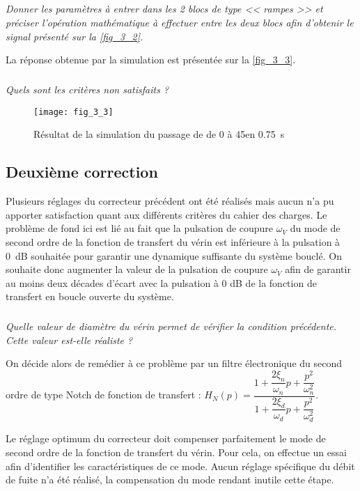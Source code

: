 \subparagraph{}
\textit{Donner les paramètres à entrer dans les 2 blocs de type << rampes >> et préciser l'opération mathématique à effectuer entre les deux blocs afin d'obtenir le signal présenté sur la \autoref{fig_3_2}.}
\ifprof
\begin{corrige}
\end{corrige}
\else
\fi

La réponse obtenue par la simulation est présentée sur la \autoref{fig_3_3}.

\subparagraph{}
\textit{Quels sont les critères non satisfaits ?}
\ifprof
\begin{corrige}
\end{corrige}
\else
\fi


\begin{figure}[H]
\centering
\texttt{[image: fig\_3\_3]}
\caption{Résultat de la simulation du passage de de 0 à 45\degres en \SI{0,75}{s}}
\label{fig_3_3}
\end{figure}




\subsection{Deuxième correction}

Plusieurs réglages du correcteur précédent ont été réalisés mais aucun n'a pu apporter satisfaction quant aux différents critères du cahier des charges. Le problème de fond ici est lié au fait que la pulsation de coupure $\omega_V$ du mode de second ordre de la fonction de transfert du vérin est inférieure à la pulsation à \SI{0}{dB} souhaitée pour garantir une dynamique suffisante du système bouclé. On souhaite donc augmenter la valeur de la pulsation de coupure $\omega_V$ afin de garantir au moins deux décades d'écart avec la pulsation à 0 dB de la fonction de transfert en boucle ouverte du système.

\subparagraph{}
\textit{Quelle valeur de diamètre du vérin permet de vérifier la condition précédente. Cette valeur est-elle réaliste ?}
\ifprof
\begin{corrige}
\end{corrige}
\else
\fi


On décide alors de remédier à ce problème par un filtre électronique du second ordre de type Notch 
de fonction de transfert :
$H_{N}(p)=\dfrac{1+ \dfrac{2\xi_n}{\omega_n}p + \dfrac{p^2}{\omega_n^2} }{1+ \dfrac{2\xi_d}{\omega_d}p + \dfrac{p^2}{\omega_d^2} }$.

Le réglage optimum du correcteur doit compenser parfaitement le mode de second ordre de la fonction de transfert du vérin. Pour cela, on effectue un essai afin d'identifier les caractéristiques de ce mode. Aucun réglage spécifique du débit de fuite n'a été réalisé, la compensation du mode rendant inutile cette étape.

